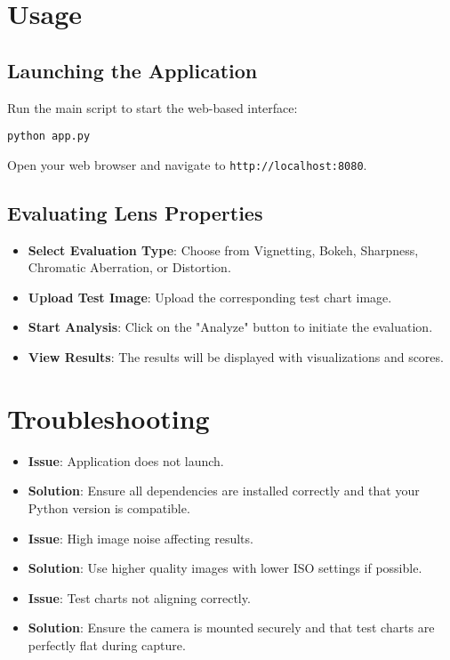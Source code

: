 \section{Usage}
\subsection{Launching the Application}
Run the main script to start the web-based interface:
\begin{verbatim}
python app.py
\end{verbatim}
Open your web browser and navigate to \texttt{http://localhost:8080}.

\subsection{Evaluating Lens Properties}
\begin{itemize}
    \item \textbf{Select Evaluation Type}: Choose from Vignetting, Bokeh, Sharpness, Chromatic Aberration, or Distortion.
    \item \textbf{Upload Test Image}: Upload the corresponding test chart image.
    \item \textbf{Start Analysis}: Click on the "Analyze" button to initiate the evaluation.
    \item \textbf{View Results}: The results will be displayed with visualizations and scores.
\end{itemize}

\section{Troubleshooting}
\begin{itemize}
    \item \textbf{Issue}: Application does not launch.
    \item \textbf{Solution}: Ensure all dependencies are installed correctly and that your Python version is compatible.
    
    \item \textbf{Issue}: High image noise affecting results.
    \item \textbf{Solution}: Use higher quality images with lower ISO settings if possible.
    
    \item \textbf{Issue}: Test charts not aligning correctly.
    \item \textbf{Solution}: Ensure the camera is mounted securely and that test charts are perfectly flat during capture.
\end{itemize}

